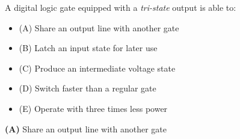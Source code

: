 

A digital logic gate equipped with a {\it tri-state} output is able to:

\begin{itemize}
\item{(A)} Share an output line with another gate
\vskip 5pt 
\item{(B)} Latch an input state for later use
\vskip 5pt 
\item{(C)} Produce an intermediate voltage state
\vskip 5pt 
\item{(D)} Switch faster than a regular gate
\vskip 5pt 
\item{(E)} Operate with three times less power
\end{itemize}







{\bf (A)} Share an output line with another gate
 










